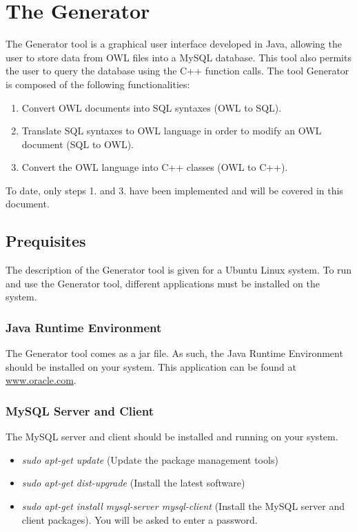 \section{The Generator}\label{generator}

The Generator tool is a graphical user interface developed in Java, allowing the user to store data from OWL files into a MySQL database. This tool also permits the user to query the database using the C++ function calls. The tool Generator is composed of the following functionalities:
\begin{enumerate}
 \item Convert OWL documents into SQL syntaxes (OWL to SQL).
 \item Translate SQL syntaxes to OWL language in order to modify an OWL document (SQL to OWL).
 \item Convert the OWL language into C++ classes (OWL to C++).
\end{enumerate}

To date, only steps 1. and 3. have been implemented and will be covered in this document.

\subsection{Prequisites}\label{s:prequisites}
The description of the Generator tool is given for a Ubuntu Linux system. To run and use the Generator tool, different applications must be installed on the system.

\subsubsection{Java Runtime Environment}
The Generator tool comes as a jar file. As such, the Java Runtime Environment should be installed on your system. This application can be found at \url{www.oracle.com}.

\subsubsection{MySQL Server and Client}
The MySQL server and client should be installed and running on your system.
\begin{itemize}
 \item \textit{sudo apt-get update} (Update the package management tools)
 \item \textit{sudo apt-get dist-upgrade} (Install the latest software)
 \item \textit{sudo apt-get install mysql-server mysql-client} (Install the MySQL server and client packages). You will be asked to enter a password.
\end{itemize}

